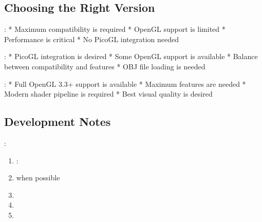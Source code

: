 \documentclass[a4paper,10pt,english,openany,oneside]{sphinxmanual}
\begin{document}
\subsection{Choosing the Right Version}
\label{\detokenize{legacy_examples:choosing-the-right-version}}
\sphinxAtStartPar
{}:
* Maximum compatibility is required
* OpenGL support is limited
* Performance is critical
* No PicoGL integration needed

\sphinxAtStartPar
{}:
* PicoGL integration is desired
* Some OpenGL support is available
* Balance between compatibility and features
* OBJ file loading is needed

\sphinxAtStartPar
{}:
* Full OpenGL 3.3+ support is available
* Maximum features are needed
* Modern shader pipeline is required
* Best visual quality is desired


\subsection{Development Notes}
\label{\detokenize{legacy_examples:development-notes}}
\sphinxAtStartPar
{}:
\begin{enumerate}
%
\item {} 
\sphinxAtStartPar
{}: 

\item {} 
\sphinxAtStartPar
{} when possible

\item {} 
\sphinxAtStartPar
{}

\item {} 
\sphinxAtStartPar
{}

\item {} 
\sphinxAtStartPar
{}

\end{enumerate}
\end{document}
